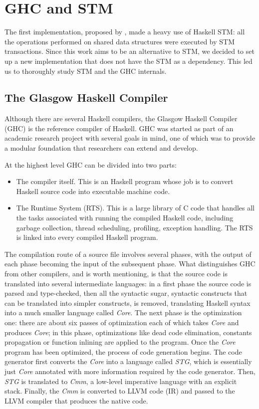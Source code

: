 
\chapter{GHC and STM}

The first implementation, proposed by \citet{Toneguzzo}, made a heavy use of Haskell STM: all the operations performed on shared data structures were executed by STM transactions. Since this work aims to be an alternative to STM, we decided to set up a new implementation that does not have the STM as a dependency. This led us to thoroughly study STM and the GHC internals.


\section{The Glasgow Haskell Compiler}
Although there are several Haskell compilers, the Glasgow Haskell Compiler (GHC) is the reference compiler of Haskell. GHC was started as part of an academic research project with several goals in mind, one of which was to provide a modular foundation that researchers can extend and develop.

At the highest level GHC can be divided into two parts:
\begin{itemize}
 \item The compiler itself. This is an Haskell program whose job is to convert Haskell source code into executable machine code.
 \item The Runtime System (RTS). This is a large library of C code that handles all the tasks associated with running the compiled Haskell code, including garbage collection, thread scheduling, profiling, exception handling. The RTS is linked into every compiled Haskell program.
 \end{itemize}
The compilation route of a source file involves several phases, with the output of each phase becoming the input of the subsequent phase. What distinguishes GHC from other compilers, and is worth mentioning, is that the source code is translated into several intermediate languages: in a first phase the source code is parsed and type-checked, then all the syntactic sugar, \ie syntactic constructs that can be translated into simpler constructs, is removed, translating Haskell syntax into a much smaller language called \emph{Core}. The next phase is the optimization one: there are about six passes of optimization each of which takes \emph{Core} and produces \emph{Core}; in this phase, optimizations like dead code elimination, constants propagation or function inlining are applied to the program. Once the \emph{Core} program has been optimized, the process of code generation begins. The code generator first converts the \emph{Core} into a language called \emph{STG}, which is essentially just \emph{Core} annotated with more information required by the code generator. Then, \emph{STG} is translated to \emph{Cmm}, a low-level imperative language with an explicit stack. Finally, the \emph{Cmm} is converted to LLVM code (IR) and passed to the LLVM compiler that produces the native code.

